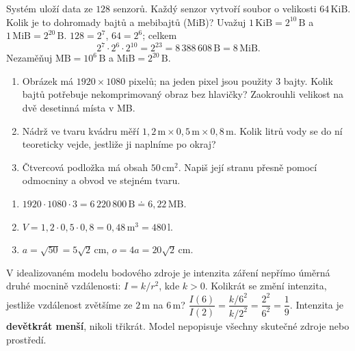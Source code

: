 \documentclass[11pt,a4paper]{article}
\begin{document}

\begin{prikladReseniBox}[title={Příklad 3},breakable=false]
Systém uloží data ze $128$ senzorů. Každý senzor vytvoří soubor o velikosti
$64\,\mathrm{KiB}$. Kolik je to dohromady bajtů a mebibajtů ($\mathrm{MiB}$)?
Uvažuj $1\,\mathrm{KiB}=2^{10}\,\mathrm B$ a $1\,\mathrm{MiB}=2^{20}\,\mathrm B$.
\tcblower
$128=2^7$, $64=2^6$; celkem
\[
2^7\cdot2^6\cdot2^{10}=2^{23}=8\,388\,608\,\mathrm B
=\boxed{8\,\mathrm{MiB}}.
\]
Nezaměňuj $\mathrm{MB}=10^6\,\mathrm B$ a $\mathrm{MiB}=2^{20}\,\mathrm B$.
\end{prikladReseniBox}

\begin{zadaniReseniBox}[title={Samostatná práce 3}]
\begin{enumerate}[label=\alph*)]
\item Obrázek má $1920\times1080$ pixelů; na jeden pixel jsou použity
$3$ bajty. Kolik bajtů potřebuje nekomprimovaný obraz bez hlavičky?
Zaokrouhli velikost na dvě desetinná místa v MB.
\item Nádrž ve tvaru kvádru měří $1{,}2\,\mathrm m\times0{,}5\,\mathrm m\times0{,}8\,\mathrm m$.
Kolik litrů vody se do ní teoreticky vejde, jestliže ji naplníme po okraj?
\item Čtvercová podložka má obsah $50\,\mathrm{cm}^2$. Napiš její
stranu přesně pomocí odmocniny a obvod ve stejném tvaru.
\end{enumerate}
\tcblower
\begin{enumerate}[label=\alph*)]
\item $1920\cdot1080\cdot3=6\,220\,800\,\mathrm B\doteq6{,}22\,\mathrm{MB}$.
\item $V=1{,}2\cdot0{,}5\cdot0{,}8=0{,}48\,\mathrm{m}^3=480\,\mathrm l$.
\item $a=\sqrt{50}=5\sqrt2\,\mathrm{cm}$,
$o=4a=20\sqrt2\,\mathrm{cm}$.
\end{enumerate}
\end{zadaniReseniBox}

\begin{prikladReseniBox}[title={Rozšíření 1},breakable=false]
V idealizovaném modelu bodového zdroje je intenzita záření nepřímo
úměrná druhé mocnině vzdálenosti: $I=k/r^2$, kde $k>0$.
Kolikrát se změní intenzita, jestliže vzdálenost zvětšíme ze
$2\,\mathrm m$ na $6\,\mathrm m$?
\tcblower
$\dfrac{I(6)}{I(2)}=\dfrac{k/6^2}{k/2^2}=
\dfrac{2^2}{6^2}=\dfrac19$.
Intenzita je \textbf{devětkrát menší}, nikoli třikrát.
Model nepopisuje všechny skutečné zdroje nebo prostředí.
\end{prikladReseniBox}
\end{document}
